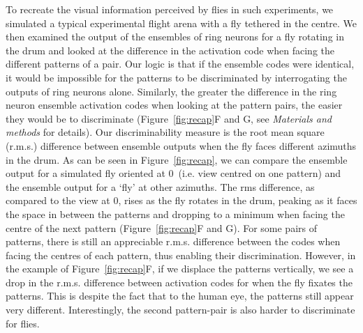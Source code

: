 To recreate the visual information perceived by flies in such experiments, we simulated a typical experimental flight arena with a fly tethered in the centre. We then examined the output of the ensembles of ring neurons for a fly rotating in the drum and looked at the difference in the activation code when facing the different patterns of a pair. Our logic is that if the ensemble codes were identical, it would be impossible for the patterns to be discriminated by interrogating the outputs of ring neurons alone. Similarly, the greater the difference in the ring neuron ensemble activation codes when looking at the pattern pairs, the easier they would be to discriminate (Figure~\ref{fig:recap}F and G, see \emph{Materials and methods} for details). Our discriminability measure is the root mean square (r.m.s.) difference between ensemble outputs when the fly faces different azimuths in the drum. As can be seen in Figure~\ref{fig:recap}, we can compare the ensemble output for a simulated fly oriented at 0\degree\ (i.e. view centred on one pattern) and the ensemble output for a ‘fly’ at other azimuths. The \ac{rms} difference, as compared to the view at 0\degree, rises as the fly rotates in the drum, peaking as it faces the space in between the patterns and dropping to a minimum when facing the centre of the next pattern (Figure~\ref{fig:recap}F and G). For some pairs of patterns, there is still an appreciable r.m.s. difference between the codes when facing the centres of each pattern, thus enabling their discrimination. However, in the example of Figure~\ref{fig:recap}F, if we displace the patterns vertically, we see a drop in the r.m.s. difference between activation codes for when the fly fixates the patterns. This is despite the fact that to the human eye, the patterns still appear very different. Interestingly, the second pattern-pair is also harder to discriminate for flies.

